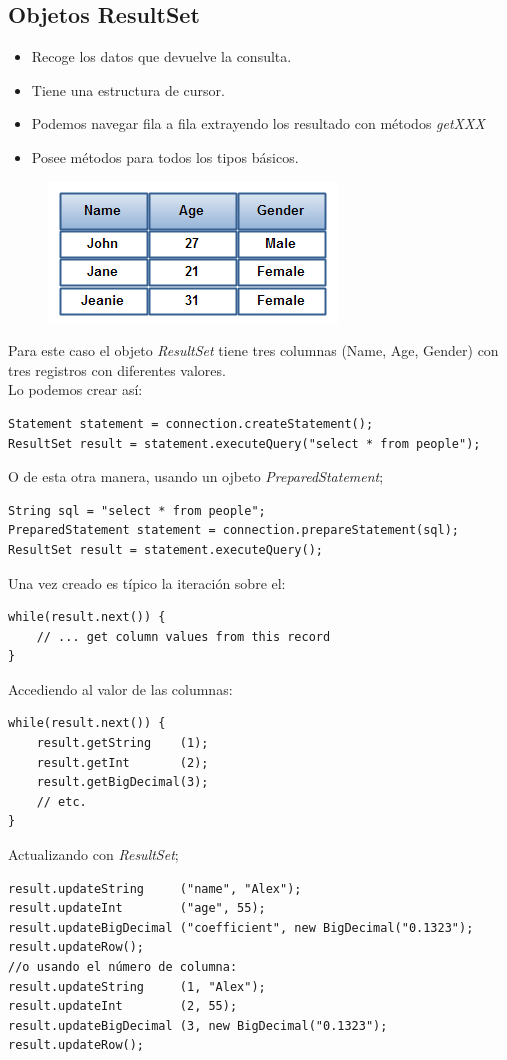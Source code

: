 \documentclass[4paper]{article}
\begin{document}
\subsection{Objetos ResultSet}
\begin{itemize}
\item Recoge los datos que devuelve la consulta.
\item Tiene una estructura de cursor.
\item Podemos navegar fila a fila extrayendo los resultado con métodos \emph{getXXX}
\item Posee métodos para todos los tipos básicos.
\end{itemize}
\begin{figure}[H]
\centering
\includegraphics[scale=0.5]{imagenes/resultset.png}
\end{figure}
Para este caso el objeto \emph{ResultSet} tiene tres columnas (Name, Age, Gender) con tres registros con diferentes valores.\\
Lo podemos crear así:
\begin{lstlisting}
Statement statement = connection.createStatement();
ResultSet result = statement.executeQuery("select * from people");
\end{lstlisting}

O de esta otra manera, usando un ojbeto \emph{PreparedStatement};
\begin{lstlisting}
String sql = "select * from people";
PreparedStatement statement = connection.prepareStatement(sql);
ResultSet result = statement.executeQuery();
\end{lstlisting}
Una vez creado es típico la iteración sobre el:
\begin{lstlisting}
while(result.next()) {
    // ... get column values from this record
}
\end{lstlisting}
Accediendo al valor de las columnas:
\begin{lstlisting}
while(result.next()) {
    result.getString    (1);
    result.getInt       (2);
    result.getBigDecimal(3);
    // etc.
}
\end{lstlisting}
Actualizando con \emph{ResultSet};
\begin{lstlisting}
result.updateString     ("name", "Alex");
result.updateInt        ("age", 55);
result.updateBigDecimal ("coefficient", new BigDecimal("0.1323");
result.updateRow();
//o usando el número de columna:
result.updateString     (1, "Alex");
result.updateInt        (2, 55);
result.updateBigDecimal (3, new BigDecimal("0.1323");
result.updateRow();
\end{lstlisting}
\end{document}
